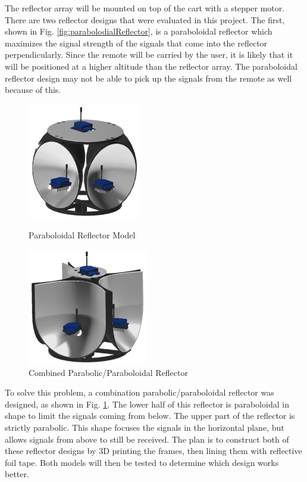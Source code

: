 \vspace*{12pt}
\noindent
The reflector array will be mounted on top of the cart with a stepper motor.
There are two reflector designs that were evaluated in this project. The first,
shown in Fig. \ref{fig:parabolodialReflector}, is a paraboloidal reflector which
maximizes the signal strength of the signals that come into the reflector
perpendicularly. Since the remote will be carried by the user, it is likely that
it will be positioned at a higher altitude than the reflector array. The
paraboloidal reflector design may not be able to pick up the signals from the
remote as well because of this. %
%
%
\begin{figure}
  \centering
  \begin{minipage}[t]{0.5\textwidth}
    \centering
    \includegraphics[height=2in]{figs/img/paraboloidalReflector}
    \captionsetup{width=\textwidth, justification=raggedright}
    \caption{Paraboloidal Reflector Model}
    \label{fig:parabolodialReflector}
  \end{minipage}
  \begin{minipage}[t]{0.4\textwidth}
    \centering
    \includegraphics[height=2in]{figs/img/parabolicReflector}
    \captionsetup{width=\textwidth, justification=raggedright}
    \caption{Combined Parabolic/Paraboloidal Reflector}
    \label{fig:parabolicReflector1}
  \end{minipage}
\end{figure}
%

To solve this problem, a combination parabolic/paraboloidal reflector was
designed, as shown in Fig. \ref{fig:parabolicReflector1}. The lower half of this
reflector is paraboloidal in shape to limit the signals coming from below. The
upper part of the reflector is strictly parabolic. This shape focuses the
signals in the horizontal plane, but allows signals from above to still be
received. The plan is to construct both of these reflector designs by 3D
printing the frames, then lining them with reflective foil tape. Both models
will then be tested to determine which design works better.


